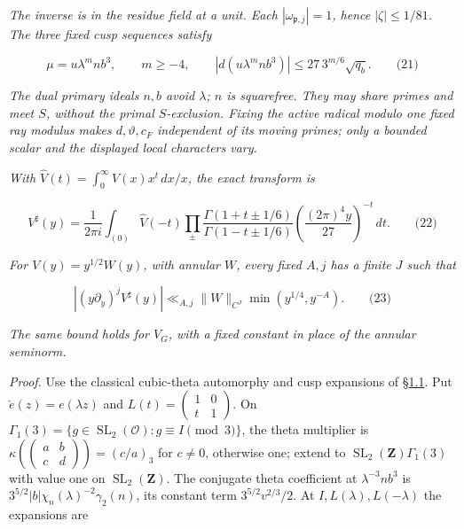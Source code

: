 \emph{The inverse is in the residue field at a unit. Each \(|\omega_{\mathfrak p,j}|=1\), hence \(|\zeta|\le1/81\). The three fixed cusp sequences satisfy \hypertarget{cf:eq:B.5}{}\label{cf:eq:B.5}}

\[
\mu=u\lambda^mnb^3,\qquad m\ge-4,
\qquad |d(u\lambda^mnb^3)|\le27\,3^{m/6}\sqrt{q_b}.
\qquad\text{(21)}
\]

\emph{The dual primary ideals \(n,b\) avoid \(\lambda\); \(n\) is squarefree. They may share primes and meet \(S\), without the primal \(S\)-exclusion. Fixing the active radical modulo one fixed ray modulus makes \(d,\vartheta,c_F\) independent of its moving primes; only a bounded scalar and the displayed local characters vary.}

\emph{With \(\widehat V(t)=\int_0^\infty V(x)x^t\,dx/x\), the exact transform is \hypertarget{cf:eq:B.6}{}\label{cf:eq:B.6}}

\[
V^\sharp(y)=\frac1{2\pi i}\int_{(0)}\widehat V(-t)
\prod_{\pm}\frac{\Gamma(1+t\pm1/6)}{\Gamma(1-t\pm1/6)}
\left(\frac{(2\pi)^4y}{27}\right)^{-t}\,dt.
\qquad\text{(22)}
\]

\emph{For \(V(y)=y^{1/2}W(y)\), with annular \(W\), every fixed \(A,j\) has a finite \(J\) such that \hypertarget{cf:eq:B.7}{}\label{cf:eq:B.7}}

\[
|(y\partial_y)^jV^\sharp(y)|
\ll_{A,j}\|W\|_{C^J}\min(y^{1/4},y^{-A}).
\qquad\text{(23)}
\]

\emph{The same bound holds for \(V_G\), with a fixed constant in place of the annular seminorm.}

\emph{Proof.} Use the classical cubic-theta automorphy and cusp expansions of §\protect\hyperlink{cf:classical-inputs}{1.1}. Put \(\check e(z)=e(\lambda z)\) and \(L(t)=\left(\begin{smallmatrix}1&0\\t&1\end{smallmatrix}\right)\). On \(\Gamma_1(3)=\{g\in\operatorname{SL}_2(\mathcal O):g\equiv I\pmod3\}\), the theta multiplier is \(\kappa(\left(\begin{smallmatrix}a&b\\c&d\end{smallmatrix}\right))=(c/a)_3\) for \(c\ne0\), otherwise one; extend to \(\operatorname{SL}_2(\mathbf Z)\Gamma_1(3)\) with value one on \(\operatorname{SL}_2(\mathbf Z)\). The conjugate theta coefficient at \(\lambda^{-3}nb^3\) is \(3^{5/2}|b|\chi_n(\lambda)^{-2}\gamma_2(n)\), its constant term \(3^{5/2}v^{2/3}/2\). At \(I,L(\lambda),L(-\lambda)\) the expansions are

